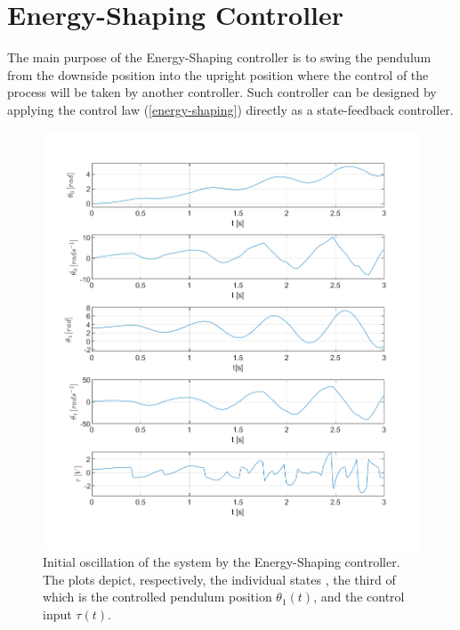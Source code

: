 \section{Energy-Shaping Controller}
The main purpose of the Energy-Shaping controller is to swing the pendulum from the downside position into the upright position where the control of the process will be taken by another controller. 
Such controller can be designed by applying the control law (\ref{energy-shaping}) directly as a state-feedback controller.
\newpage
\begin{figure}[H]
	\centering
	\includegraphics[width=1.1\linewidth]{images/Swing}
	\caption{Initial oscillation of the system by the Energy-Shaping controller. The plots depict, respectively, the individual states , the third of which is the controlled pendulum position $\theta_1(t)$, and the control input $\tau(t)$.}
	\label{swing}
\end{figure}
\newpage
